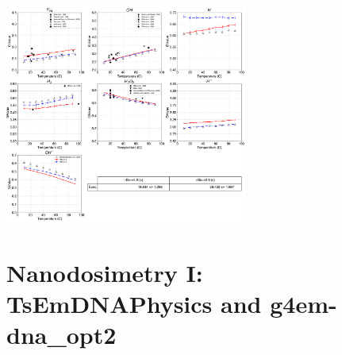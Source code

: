 \documentclass[aspectratio=1610]{beamer}
\begin{document}
\begin{frame}{\secname}
 \centering
  \includegraphics[width=0.6\textwidth]{./GvalueIRT-Temperature/TemperatureEvolution}
\end{frame}

\section{Nanodosimetry I: TsEmDNAPhysics and g4em-dna\_opt2}
\end{document}
